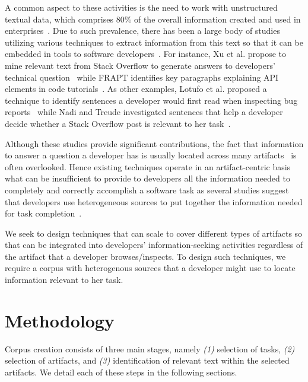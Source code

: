 A common aspect to these activities is the need to work with unstructured textual data, which comprises 80\% of the overall information created and used in enterprises~\cite{Bavota2014, holzinger2013}.
Due to such prevalence, there has been a large body of studies utilizing various techniques to extract
information from this text so that it can be embedded in
tools to software developers~\cite{Bavota2014, Xu2017, Robillard2015, Lotufo2012}. For instance, Xu et al. propose to mine relevant text from Stack Overflow
to generate answers to developers' technical question~\cite{Xu2017}
while FRAPT identifies key paragraphs explaining API elements in code tutorials~\cite{Jiang2017}.
As other examples, Lotufo et al. proposed a technique to identify sentences a developer would first read when inspecting bug reports~\cite{Lotufo2012} while Nadi and Treude investigated sentences that help a developer decide whether a Stack Overflow post is relevant to her task~\cite{nadi2020}.




Although these studies provide significant contributions, the fact that information to answer a question a developer has is usually located across many artifacts~\cite{Rastkar2013t} is often overlooked.
Hence existing techniques operate in an artifact-centric basis
what can be insufficient to provide to developers all the information needed
to completely and correctly accomplish a software task as several studies suggest that developers use heterogeneous sources to put together the information needed for task completion~\cite{josyula2018, Li2013, rao2020}.




We seek to design techniques that can scale to cover different types of artifacts
so that can be integrated into developers' information-seeking activities regardless of the artifact that a developer browses/inspects.
To design such techniques, we require a corpus with heterogenous sources that a developer
might use to locate information relevant to her task.









\section{Methodology}
\label{cp4:methodology}

Corpus creation consists of three main stages, namely \textit{(1)} selection of tasks, \textit{(2)} selection of artifacts, and \textit{(3)} identification of relevant text within the selected artifacts. We detail each of these steps in the following sections.




